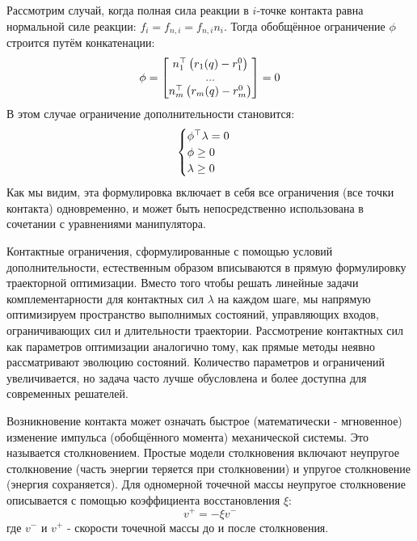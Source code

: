 Рассмотрим случай, когда полная сила реакции в $i$-точке контакта равна нормальной силе реакции: ${f}_i = {f}_{n,i} = f_{n,i} {n}_i$. Тогда обобщённое ограничение $\phi$ строится путём конкатенации:
%
\begin{align}
	\phi = \begin{bmatrix}
		{n}_1^\top \left({r}_1({q}) - {r}_1^0 \right) \\
		... \\
		{n}_m^\top \left({r}_m({q}) - {r}_m^0 \right)
	\end{bmatrix}
	= 0
\end{align}
%
В этом случае ограничение дополнительности становится:
%
\begin{align}
	\begin{cases}
		\phi^\top \lambda = 0 \\
		\phi \geq 0 \\
		\lambda \geq 0
	\end{cases}
\end{align}
%
Как мы видим, эта формулировка включает в себя все ограничения (все точки контакта) одновременно, и может быть непосредственно использована в сочетании с уравнениями манипулятора.

Контактные ограничения, сформулированные с помощью условий дополнительности, естественным образом вписываются в прямую формулировку траекторной оптимизации. Вместо того чтобы решать линейные задачи комплементарности для контактных сил $\lambda$ на каждом шаге, мы напрямую оптимизируем пространство выполнимых состояний, управляющих входов, ограничивающих сил и длительности траектории. Рассмотрение контактных сил как параметров оптимизации аналогично тому, как прямые методы неявно рассматривают эволюцию состояний. Количество параметров и ограничений увеличивается, но задача часто лучше обусловлена и более доступна для современных решателей.

Возникновение контакта может означать быстрое (математически - мгновенное) изменение импульса (обобщённого момента) механической системы. Это называется столкновением.
%
Простые модели столкновения включают неупругое столкновение (часть энергии теряется при столкновении) и упругое столкновение (энергия сохраняется).
%
Для одномерной точечной массы неупругое столкновение описывается с помощью коэффициента восстановления $\xi$:
%
\begin{equation}
	v^+ = -\xi v^-
\end{equation}
%
где $v^-$ и $v^+$ - скорости точечной массы до и после столкновения.

